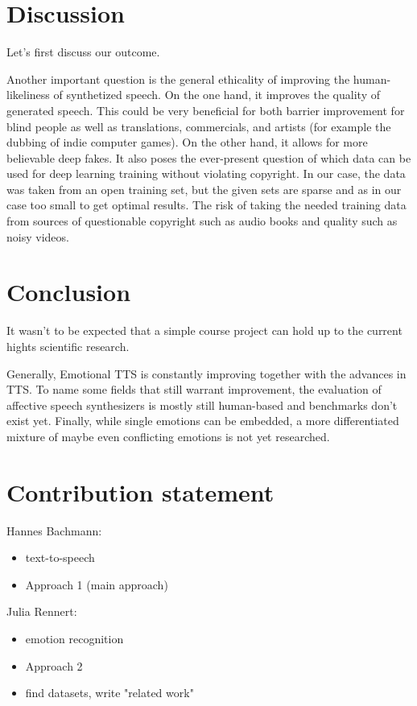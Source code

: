 \documentclass[11pt]{article}
\begin{document}
\section{Discussion}
Let's first discuss our outcome.

Another important question is the general ethicality of improving the human-likeliness of synthetized speech. On the one hand, it improves the quality of generated speech. This could be very beneficial for both barrier improvement for blind people as well as translations, commercials, and artists (for example the dubbing of indie computer games). On the other hand, it allows for more believable deep fakes. It also poses the ever-present question of which data can be used for deep learning training without violating copyright. In our case, the data was taken from an open training set, but the given sets are sparse and as in our case too small to get optimal results\cite{he_improve_2022}. The risk of taking the needed training data from sources of questionable copyright such as audio books and quality such as noisy videos.

\section{Conclusion}

It wasn't to be expected that a simple course project can hold up to the current hights scientific research.

Generally, Emotional TTS is constantly improving together with the advances in TTS. To name some fields that still warrant improvement, the evaluation of affective speech synthesizers is mostly still human-based and benchmarks don't exist yet. Finally, while single emotions can be embedded, a more differentiated mixture of maybe even conflicting emotions is not yet researched.

\section{Contribution statement}
Hannes Bachmann:
\begin{itemize}
\item text-to-speech
\item Approach 1 (main approach)
\end{itemize}
Julia Rennert:
\begin{itemize}
\item emotion recognition
\item Approach 2
\item find datasets, write "related work"
\end{itemize}
\end{document}
